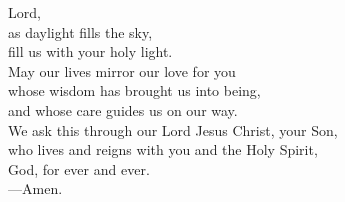 \prayer


\begin{prayerverse}
Lord,\\
as daylight fills the sky,\\
fill us with your holy light.\\
May our lives mirror our love for you\\
whose wisdom has brought us into being,\\
and whose care guides us on our way.\\
We ask this through our Lord Jesus Christ, your Son,\\
who lives and reigns with you and the Holy Spirit,\\
God, for ever and ever.\\
{\color{red}---\thinspace}Amen.
\end{prayerverse}

